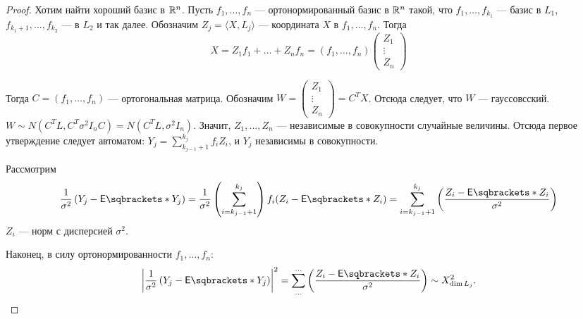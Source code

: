 \begin{proof}
    Хотим найти хороший базис в \(\mathbb{R}^n\). Пусть \(f_1, \ldots, f_n\) --- ортонормированный базис в \(\mathbb{R}^n\) такой, что \(f_1, \ldots, f_{k_1}\) --- базис в \(L_1\), \(f_{k_1 + 1}, \ldots, f_{k_2}\) --- в \(L_2\) и так далее. Обозначим \(Z_j = \langle X, L_j \rangle\)  --- координата \(X\) в \(f_1, \ldots, f_n\). Тогда
    \begin{displaymath}
        X = Z_1 f_1 + \ldots + Z_n f_n = (f_1, \ldots, f_n) \begin{pmatrix}
            Z_1 \\ \vdots \\ Z_n
        \end{pmatrix}
    \end{displaymath}

    Тогда \(C = (f_1, \ldots, f_n)\) --- ортогональная матрица. Обозначим \(W = \begin{pmatrix}
        Z_1 \\ \vdots \\ Z_n
    \end{pmatrix} = C^T X\).
    Отсюда следует, что \(W\) --- гауссовсский. \(W \sim N(C^T L, C^T \sigma^2 I_n C) = N(C^T L, \sigma^2 I_n)\).
    Значит, \(Z_1, \ldots, Z_n\) --- независимые в совокупности случайные величины. Отсюда первое утверждение следует автоматом: \(Y_j = \sum_{k_{j - 1} + 1}^{k_j} f_i Z_i\), и \(Y_j\) независимы в совокупности.

    Рассмотрим
    \begin{displaymath}
        \frac{1}{\sigma^2}\br{Y_j - \EE{Y_j}} = \frac{1}{\sigma^2} \br{\sum_{i = k_{j - 1} + 1}^{k_j}} f_i (Z_i - \EE{Z_i}) =\sum_{i = k_{j - 1} + 1}^{k_j} \br{\frac{Z_i - \EE{Z_i}}{\sigma^2}}
    \end{displaymath}
    \(Z_i\) --- норм с дисперсией \(\sigma^2\).

    Наконец, в силу ортонормированности \(f_1, \ldots, f_n\):
    \begin{displaymath}
        \abs{
            \frac{
                1
            }{
                \sigma^2
            }
            \br{
                Y_j - \EE{Y_j}
            }
        }^2 = \sum_{\ldots}^{\ldots} \br{
            \frac{
                Z_i - \EE{Z_i}
            }{
                \sigma^2
            }
        } \sim X_{\dim L_j}^2.
    \end{displaymath}
\end{proof}

